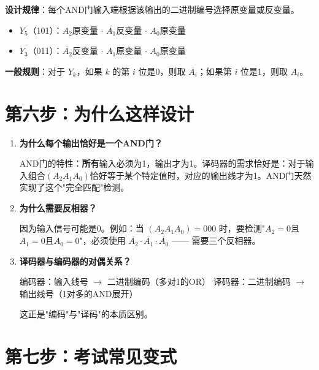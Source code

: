 \textbf{设计规律}：每个AND门输入端根据该输出的二进制编号选择原变量或反变量。
\begin{itemize}
  \item $Y_5$（101）：$A_2$原变量 $\cdot$ $\overline{A_1}$反变量 $\cdot$ $A_0$原变量
  \item $Y_3$（011）：$\overline{A_2}$反变量 $\cdot$ $A_1$原变量 $\cdot$ $A_0$原变量
\end{itemize}

\textbf{一般规则}：对于 $Y_k$，如果 $k$ 的第 $i$ 位是0，则取 $\overline{A_i}$；如果第 $i$ 位是1，则取 $A_i$。

\section{第六步：为什么这样设计}

\begin{enumerate}
  \item \textbf{为什么每个输出恰好是一个AND门？}

  AND门的特性：\textbf{所有}输入必须为1，输出才为1。译码器的需求恰好是：对于输入组合$(A_2 A_1 A_0)$恰好等于某个特定值时，对应的输出线才为1。AND门天然实现了这个"完全匹配"检测。

  \item \textbf{为什么需要反相器？}

  因为输入信号可能是0。例如：当 $(A_2 A_1 A_0) = 000$ 时，要检测"$A_2=0$且$A_1=0$且$A_0=0$"，必须使用 $\overline{A_2} \cdot \overline{A_1} \cdot \overline{A_0}$ —— 需要三个反相器。

  \item \textbf{译码器与编码器的对偶关系？}

  编码器：输入线号 $\to$ 二进制编码（多对1的OR）
  译码器：二进制编码 $\to$ 输出线号（1对多的AND展开）

  这正是"编码"与"译码"的本质区别。
\end{enumerate}

\section{第七步：考试常见变式}

